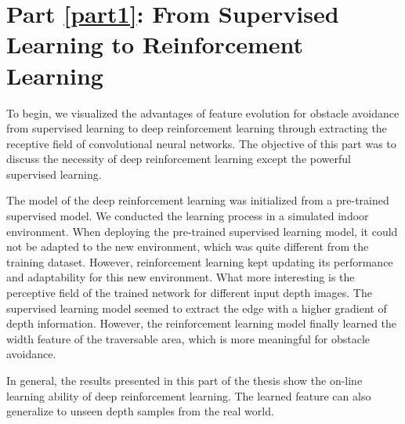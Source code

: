 \section{Part \ref{part1}: From Supervised Learning to Reinforcement Learning}
To begin, we visualized the advantages of feature evolution for obstacle avoidance from supervised learning to deep reinforcement learning through extracting the receptive field of convolutional neural networks. The objective of this part was to discuss the necessity of deep reinforcement learning except the powerful supervised learning.

The model of the deep reinforcement learning was initialized from a pre-trained supervised model. We conducted the learning process in a simulated indoor environment. When deploying the pre-trained supervised learning model, it could not be adapted to the new environment, which was quite different from the training dataset. However, reinforcement learning kept updating its performance and adaptability for this new environment. What more interesting is the perceptive field of the trained network for different input depth images. The supervised learning model seemed to extract the edge with a higher gradient of depth information. However, the reinforcement learning model finally learned the width feature of the traversable area, which is more meaningful for obstacle avoidance.

In general, the results presented in this part of the thesis show the on-line learning ability of deep reinforcement learning. The learned feature can also generalize to unseen depth samples from the real world.

